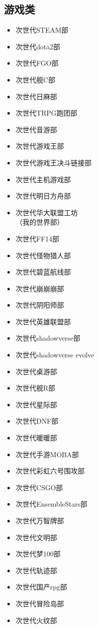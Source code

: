 \documentclass[twoside,12pt]{book}
\newenvironment{categorysection}[1]{
  \subsection*{\textcolor{truepurple}{#1}}
  \begin{itemize}[leftmargin=*, 
                 nosep,               %
                 itemsep=2pt,         %
                 parsep=0pt,          %
                 before=\setlength{\baselineskip}{23pt} %
  ]
}{
  \end{itemize}
}
\begin{document}
\begin{multicols}{3}
    \begin{categorysection}{游戏类}
        \item 次世代STEAM部
        \item 次世代dota2部
        \item 次世代FGO部
        \item 次世代舰C部
        \item 次世代日麻部
        \item 次世代TRPG跑团部
        \item 次世代音游部
        \item 次世代游戏王部
        \item 次世代游戏王决斗链接部
        \item 次世代主机游戏部
        \item 次世代明日方舟部
        \item 次世代华大联盟工坊\\（我的世界部）
        \item 次世代FF14部
        \item 次世代怪物猎人部
        \item 次世代碧蓝航线部
        \item 次世代崩崩崩部
        \item 次世代阴阳师部
        \item 次世代英雄联盟部
        \item 次世代shadowverse部
        \item 次世代shadowverse evolve
        \item 次世代桌游部
        \item 次世代舰R部
        \item 次世代星际部
        \item 次世代DNF部
        \item 次世代暖暖部
        \item 次世代手游MOBA部
        \item 次世代彩虹六号围攻部
        \item 次世代CSGO部
        \item 次世代EnsembleStars部
        \item 次世代万智牌部
        \item 次世代文明部
        \item 次世代梦100部
        \item 次世代轨迹部
        \item 次世代国产rpg部
        \item 次世代冒险岛部
        \item 次世代火纹部

\end{categorysection}
\end{multicols}
\end{document}
